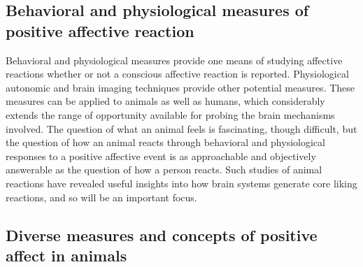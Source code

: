\documentclass[conference]{IEEEtran}
\begin{document}
\subsection{Behavioral and physiological measures of positive affective reaction}
Behavioral and physiological measures provide one
means of studying affective reactions whether or not a
conscious affective reaction is reported. Physiological
autonomic and brain imaging techniques provide other
potential measures. These measures can be applied to
animals as well as humans, which considerably extends
the range of opportunity available for probing the brain
mechanisms involved. The question of what an animal
feels is fascinating, though difficult, but the question of
how an animal reacts through behavioral and physiological responses to a positive affective event is as approachable and objectively answerable as the question
of how a person reacts. Such studies of animal reactions
have revealed useful insights into how brain systems
generate core liking reactions, and so will be an important focus.


\subsection{Diverse measures and concepts of positive affect in
animals}
\end{document}
